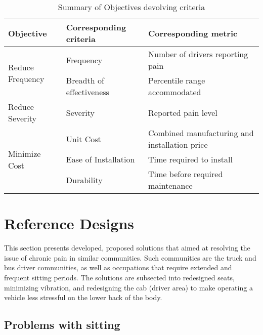 \documentclass[11pt]{article}
\begin{document}
\begin{table}[h!]
\centering
\caption{Summary of Objectives devolving criteria}
\begin{tabular}{l l p{5cm}}
Objective & Corresponding criteria & Corresponding metric \\ \hline
\multirow{2}{*}{Reduce Frequency} & Frequency & Number of drivers reporting pain \\
& Breadth of effectiveness & Percentile range accommodated \\ \hline
Reduce Severity & Severity & Reported pain level \\ \hline
\multirow{3}{*}{Minimize Cost} & Unit Cost & Combined manufacturing and installation price \\
& Ease of Installation & Time required to install \\
& Durability & Time before required maintenance \\
\end{tabular}
\end{table}
\newpage
\section{Reference Designs}
\label{sec:designs}

This section presents developed, proposed solutions that aimed at resolving the issue of
chronic pain in similar communities. Such communities are the truck and bus driver communities, as well as occupations 
that require extended and frequent sitting periods. The solutions are subsected into
redesigned seats, minimizing vibration, and redesigning the cab (driver area) to make operating a vehicle
less stressful on the lower back of the body.

\subsection{Problems with sitting}
\label{sec:sittingproblems}
\end{document}
